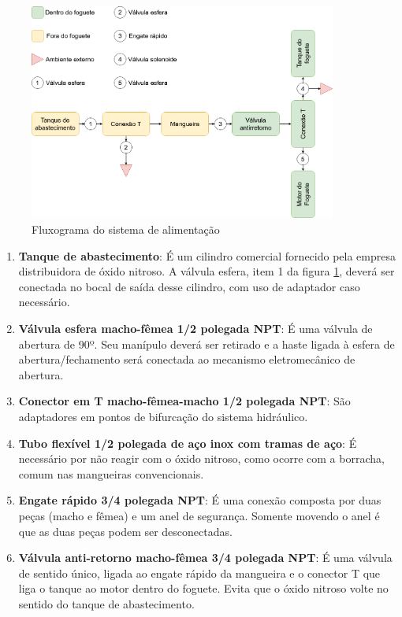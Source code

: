 \begin{figure}[H]
\centering
\includegraphics[width=0.9\textwidth]{figuras/diagramaAlimentacao}
\caption{Fluxograma do sistema de alimentação}
\label{fig:sistema de alimentacao}
\end{figure}

\begin{enumerate}
\begin{enumerate}[a]
    \item \textbf{Tanque de abastecimento}: É um cilindro comercial fornecido pela empresa distribuidora de óxido nitroso. A válvula esfera, item 1 da figura \ref{fig:sistema de alimentacao}, deverá ser conectada no bocal de saída desse cilindro, com uso de adaptador caso necessário.
    \item \textbf{Válvula esfera macho-fêmea 1/2 polegada NPT}: É uma válvula de abertura de 90º. Seu manípulo deverá ser retirado e a haste ligada à esfera de abertura/fechamento será conectada ao mecanismo eletromecânico de abertura. 
    \item \textbf{Conector em T macho-fêmea-macho 1/2 polegada NPT}: São adaptadores em pontos de bifurcação do sistema hidráulico.
    \item \textbf{Tubo flexível 1/2 polegada de aço inox com tramas de aço}: É necessário por não reagir com o óxido nitroso, como ocorre com a borracha, comum nas mangueiras convencionais.
    \item \textbf{Engate rápido 3/4 polegada NPT}: É uma conexão composta por duas peças (macho e fêmea) e um anel de segurança. Somente movendo o anel é que as duas peças podem ser desconectadas.
    \item \textbf{Válvula anti-retorno macho-fêmea 3/4 polegada NPT}: É uma válvula de sentido único, ligada ao engate rápido da mangueira e o conector T que liga o tanque ao motor dentro do foguete. Evita que o óxido nitroso volte no sentido do tanque de abastecimento.
    
\end{enumerate}
\end{enumerate}

